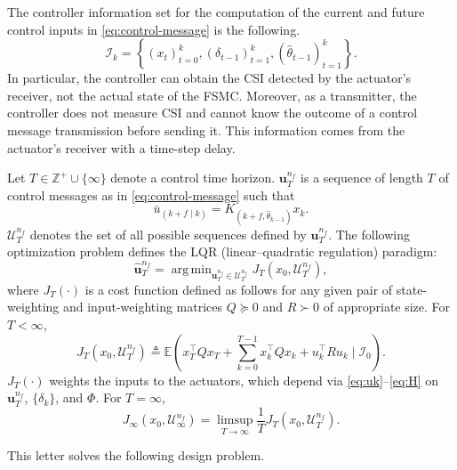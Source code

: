 \documentclass[journal,twoside,web]{ieeecolor}
\begin{document}
The controller information set for the computation of the current and future control inputs in \eqref{eq:control-message} is the following.
	\begin{equation}\label{eq:info-set}
\mathcal{I}_{k} = \left\{
	\left(x_{t}\right)_{t=0}^{k}, 
	\left(\delta_{t-1}\right)_{t=1}^{k}, 
	(\hat{\theta}_{t-1})_{t=1}^{k} \right\}.
\end{equation}
In particular, the controller can obtain the CSI detected by the actuator's receiver, not the actual state of the FSMC. Moreover, as a transmitter, the controller does not measure CSI and cannot know the outcome of a control message transmission before sending it. This information comes from the actuator's receiver with a time-step delay.

Let $T\in\mathbb{Z}^{+} \cup \{\infty\}$ denote a control time horizon. $\bm{u}_{T}^{n_f}$ is a sequence of length $T$ of control messages as in \eqref{eq:control-message} such that
\begin{equation}\label{eq:control-element}
    \bar{u}_{(k+f\mid k)} = K_{(k+f,\hat{\theta}_{k-1})}x_k.
\end{equation}
$\mathcal{U}_{T}^{n_f}$ denotes the set of all possible sequences defined by $\bm{u}_{T}^{n_f}$.
The following optimization problem defines
the LQR (linear--quadratic regulation) paradigm:
\begin{equation}\label{eq:control-fin}
    \hat{\bm{u}}_{T}^{n_f} = \mathop{\mathrm{arg\,min}}_{\bm{u}_{T}^{n_f} \in \mathcal{U}_{T}^{n_f}} J_{T}^{}(x_0,\mathcal{U}_{T}^{n_f}),
\end{equation}
where $J_{T}^{}(\cdot)$ is a cost function defined as follows for any given pair of state-weighting and input-weighting matrices $Q\succeq 0$ and $R \succ 0$ of appropriate size.
For $T<\infty$,
\begin{equation}\label{eq:cost-def-fin}
    J_{T}^{}(x_0,\mathcal{U}_{T}^{n_f}) \!\triangleq \mathbb{E}(x_T^{\top} Q x_T +\! \sum_{k=0}^{T-1} x_k^{\top} Q x_k + u_k^{\top}Ru_k \mid \mathcal{I}_0).
\end{equation}
$J_{T}^{}(\cdot)$ weights the inputs to the actuators, which depend via \eqref{eq:uk}--\eqref{eq:H} on $\bm{u}_{T}^{n_f}$, $\{\delta_k\}$, and $\mathit{\Phi}$. For $T=\infty$, 
\begin{equation}\label{eq:cost-def-inf}
    J_{\infty}^{}(x_0,\mathcal{U}_{\infty}^{n_f}) = \limsup_{T\to\infty} \frac{1}{T} J_{T}^{}(x_0,\mathcal{U}_{T}^{n_f}).
\end{equation}

This letter solves the following design problem.
\end{document}
